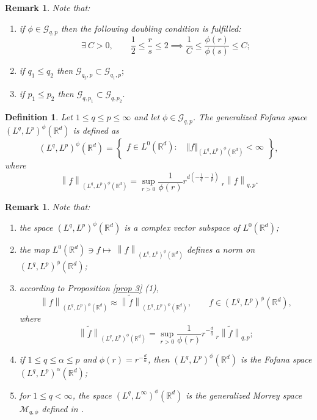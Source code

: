 \documentclass[a4paper,12pt,intlimits,oneside]{amsart}
\numberwithin{equation}{section}
\newtheorem{definition}[theorem]{Definition}
\newtheorem{remark}[theorem]{Remark}
\numberwithin{equation}{section}
\theoremstyle{definition}
\begin{document}
\begin{remark}
Note that:
\begin{enumerate}
\item if $\phi \in \mathcal{G}_{q,p}$ then the following 
doubling condition is fulfilled:
 \begin{equation}\label{eq 1}
 \exists \: C>0, \quad \quad  \frac{1}{2} \leq \frac{r}{s} \leq 2 \implies \frac{1}{C} \leq \frac{\phi (r)}{\phi(s)} \leq C;
 \end{equation}
 \item if $ q_{1}\leq q_{2}$ then $ \mathcal{G}_{q_{2},p} \subset \mathcal{G}_{q_{1},p}; $
 \item if $ p_{1}\leq p_{2}$ then $ \mathcal{G}_{q,p_{1}} \subset \mathcal{G}_{q,p_{2}}.$
\end{enumerate}
\end{remark}

 \begin{definition}
 Let $1\leq q \leq p\leq\infty$ and let $\phi \in \mathcal{G}_{q,p}$. The generalized Fofana space $ (L^{q}, L^{p})^{\phi} (\mathbb{R}^{d}) $ is defined as 
   $$(L^{q},L^{p})^{\phi}(\mathbb{R}^{d})= \left\{
     \begin{array}{ll}
     f \in L^{0}(\mathbb{R}^{d}) : \quad  \Vert f \Vert_{(L^{q},L^{p})^{\phi}(\mathbb{R}^{d}) } < \infty
     \end{array}
     \right\},$$
  where 
  \begin{equation*}
  \left\|f\right\|_{(L^{q},L^{p})^{\phi}(\mathbb{R}^{d})}=\sup_{r>0} \frac{1}{\phi(r)} r^{d(-\frac{1}{q}-\frac{1}{p})}\: _{r}\left\|f\right\|_{q,p}.
  \end{equation*}
 \end{definition}
 \begin{remark}
Note that:
\begin{enumerate}
\item the space $(L^{q}, L^{p})^{\phi} (\mathbb{R}^{d})$ is a complex vector subspace of $ L^{0}(\mathbb{R}^{d})$;
\item the map $ L^{0}(\mathbb{R}^{d}) \ni f\mapsto\ \left\|f\right\|_{(L^{q},L^{p})^{\phi}(\mathbb{R}^{d})}$ defines a norm on $(L^{q},L^{p})^{\phi}(\mathbb{R}^{d})$;
\item according to Proposition \ref{prop 3} (1),
$$ \left\|f\right\|_{(L^{q},L^{p})^{\phi}(\mathbb{R}^{d})}\approx \widetilde{\left\|f\right\|}_{(L^{q},L^{p})^{\phi}(\mathbb{R}^{d})}, \quad \quad f \in (L^{q}, L^{p})^{\phi} (\mathbb{R}^{d}),$$
where $$\widetilde{\left\|f\right\|}_{(L^{q},L^{p})^{\phi}(\mathbb{R}^{d})}=\sup_{r>0} \frac{1}{\phi(r)} r^{-\frac{d}{q}}\:_{r}\widetilde{\left\|f\right\|}_{q,p};$$
\item if  $1\leq q \leq \alpha \leq  p $ and $\phi (r) = r^{-\frac{d}{\alpha}}$, then $ (L^{q}, L^{p})^{\phi} (\mathbb{R}^{d})$ is the Fofana space $(L^{q}, L^{p})^{\alpha} (\mathbb{R}^{d})$;
\item for $1\leq q <\infty$, the space   $(L^{q},L^{\infty})^{\phi}(\mathbb{R}^{d})$ is the generalized Morrey space $\mathcal{M}_{q, \phi}$ defined in \cite{EN}.
\end{enumerate}
\end{remark}
\end{document}
